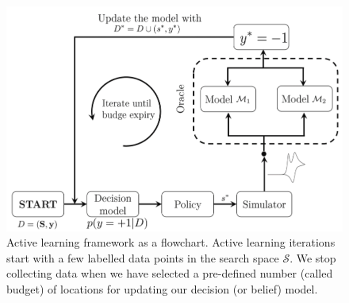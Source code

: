 \begin{figure}[h]
    \centering
    \includegraphics[width=0.75\linewidth]{Chapter-3/figures/workflow_gpcv.png}
    \caption{Active learning framework as a flowchart. Active learning iterations start with a few labelled data points in the search space \(\mathcal{S}\). We stop collecting data when we have selected a pre-defined number (called budget) of locations for updating our decision (or belief) model.}
    \label{fig:workflow}
\end{figure}
